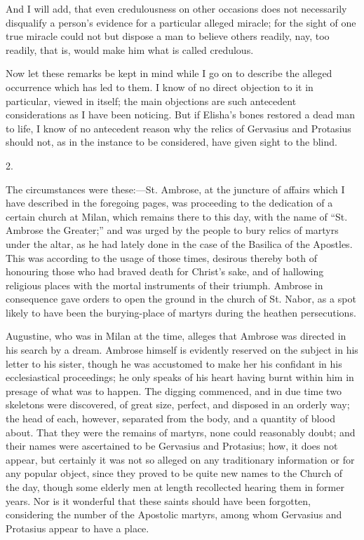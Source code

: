 And I will add, that even credulousness on other occasions does not
necessarily disqualify a person's evidence for a particular alleged
miracle; for the sight of one true miracle could not but dispose a man
to believe others readily, nay, too readily, that is, would make him
what is called credulous.

Now let these remarks be kept in mind while I go on to describe the
alleged occurrence which has led to them. I know of no direct
objection to it in particular, viewed in itself; the main objections
are such antecedent considerations as I have been noticing. But if
Elisha's bones restored a dead man to life, I know of no
antecedent reason why the relics of Gervasius and Protasius should
not, as in the instance to be considered, have given sight to the
blind.

2.

The circumstances were these:—St. Ambrose, at the juncture of
affairs which I have described in the foregoing pages, was proceeding
to the dedication of a certain church at Milan, which remains there to
this day, with the name of ``St. Ambrose the Greater;'' and
was urged by the people to bury relics of martyrs under the altar, as
he had lately done in the case of the Basilica of the Apostles. This
was according to the usage of those times, desirous thereby both of
honouring those who had braved death for Christ's sake, and of
hallowing religious places with the mortal instruments of their
triumph. Ambrose in consequence gave orders to open the ground in the
church of St. Nabor, as a spot likely to have been the burying-place
of martyrs during the heathen persecutions.

Augustine, who was in Milan at the time, alleges that Ambrose was
directed in his search by a dream. Ambrose himself is evidently
reserved on the subject in his letter to his sister, though he was
accustomed to make her his confidant in his ecclesiastical
proceedings; he only speaks of his heart having burnt within him in
presage of what was to happen. The digging commenced, and in due time
two skeletons were discovered, of great size, perfect, and disposed in
an orderly way; the head of each, however, separated from the body,
and a quantity of blood about. That they were the remains of martyrs,
none could reasonably doubt; and their names were ascertained to be
Gervasius and Protasius; how, it does not appear, but certainly
it was not so alleged on any traditionary information or for any
popular object, since they proved to be quite new names to the Church
of the day, though some elderly men at length recollected hearing them
in former years. Nor is it wonderful that these saints should have
been forgotten, considering the number of the Apostolic martyrs, among
whom Gervasius and Protasius appear to have a place.

